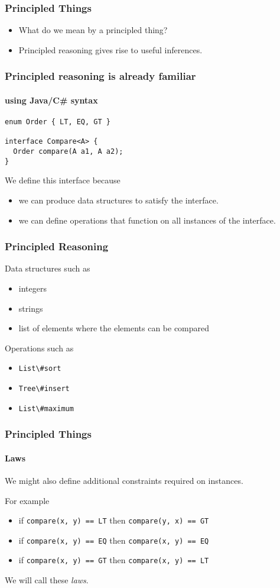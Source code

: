 \begin{frame}
\frametitle{Principled Things}
\begin{itemize}
\item<1> What do we mean by a principled thing?
\item<2> Principled reasoning gives rise to useful inferences.
\end{itemize}
\end{frame}

\begin{frame}[fragile]
\frametitle{Principled reasoning is already familiar}
\framesubtitle{using Java/C\# syntax}
\begin{lstlisting}[style=java]
enum Order { LT, EQ, GT }

interface Compare<A> {
  Order compare(A a1, A a2);
}
\end{lstlisting}
\begin{block}{We define this interface because}
\begin{itemize}
\item we can produce data structures to satisfy the interface.
\item we can define operations that function on all instances of the interface.
\end{itemize}
\end{block}
\end{frame}

\begin{frame}
\frametitle{Principled Reasoning}
\begin{block}{Data structures such as}
\begin{itemize}
\item integers
\item strings
\item list of elements where the elements can be compared
\end{itemize}
\end{block}
\begin{block}{Operations such as}
\begin{itemize}
\item \lstinline{List\#sort}
\item \lstinline{Tree\#insert}
\item \lstinline{List\#maximum}
\end{itemize}
\end{block}
\end{frame}

\begin{frame}
\frametitle{Principled Things}
\framesubtitle{Laws}
We might also define additional constraints required on instances.
\begin{block}{For example}
\begin{itemize}
\item if \lstinline{compare(x, y) == LT} then \lstinline{compare(y, x) == GT}
\item if \lstinline{compare(x, y) == EQ} then \lstinline{compare(x, y) == EQ}
\item if \lstinline{compare(x, y) == GT} then \lstinline{compare(x, y) == LT}
\end{itemize}
\end{block}
We will call these \emph{laws}.
\end{frame}
